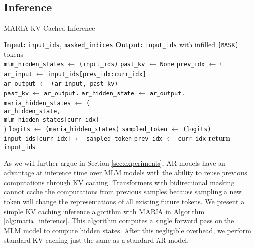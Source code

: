 \subsection*{Inference}

\begin{algorithm}[t]
\caption{MARIA KV Cached Inference}
\label{alg:maria_inference}
\begin{algorithmic}[1]
    \STATE \textbf{Input:} \texttt{input\_ids}, \texttt{masked\_indices}
    \STATE \textbf{Output:} \texttt{input\_ids} with infilled \texttt{[MASK]} tokens\\
    \STATE \texttt{mlm\_hidden\_states} $\gets$ \texttt{(input\_ids)}
    \STATE \texttt{past\_kv} $\gets$ \texttt{None}
    \STATE \texttt{prev\_idx} $\gets$ 0
        \STATE \texttt{ar\_input} $\gets$ \texttt{input\_ids[prev\_idx:curr\_idx]}\\
        \STATE \texttt{ar\_output} $\gets$ \texttt{(ar\_input, past\_kv)}\\
        \STATE \texttt{past\_kv} $\gets$ \texttt{ar\_output.}
        \STATE \texttt{ar\_hidden\_state} $\gets$ \texttt{ar\_output.}
        \STATE \texttt{maria\_hidden\_states} $\gets$ \texttt{(}\\ \qquad\texttt{ar\_hidden\_state,}\\ \qquad \texttt{mlm\_hidden\_states[curr\_idx]} \\)
        \STATE \texttt{logits} $\gets$ \texttt{(maria\_hidden\_states)}
        \STATE \texttt{sampled\_token} $\gets$ \texttt{(logits)}\\
        \STATE \texttt{input\_ids[curr\_idx]} $\gets$ \texttt{sampled\_token} 
        \STATE \texttt{prev\_idx} $\gets$ \texttt{curr\_idx}
    \ENDFOR
    \STATE \textbf{return} \texttt{input\_ids}
\end{algorithmic}
\end{algorithm}

As we will further argue in Section \ref{sec:experiments}, AR models have an advantage at inference time over MLM models with the ability to reuse previous computations through KV caching. Transformers with bidirectional masking cannot cache the computations from previous samples because sampling a new token will change the representations of all existing future tokens. We present a simple KV caching inference algorithm with MARIA in Algorithm \ref{alg:maria_inference}. This algorithm computes a single forward pass on the MLM model to compute hidden states. After this negligible overhead, we perform standard KV caching just the same as a standard AR model.
